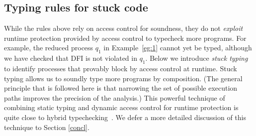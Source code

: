 \documentclass{sigplanconf}
\makeatletter
\def\upbracketfill{$\m@th\makesm@sh{\llap{\vrule\@height3\p@\@width.7\p@}}\leaders\vrule\@height.7\p@\hfill
\makesm@sh{\rlap{\vrule\@height3\p@\@width.7\p@}}$}
\def\downbracketfill{$\m@th \makesm@sh{\llap{\vrule\@height.7\p@\@depth2.3\p@\@width.7\p@}}\leaders\vrule\@height.7\p@\hfill \makesm@sh{\rlap{\vrule\@height.7\p@\@depth2.3\p@\@width.7\p@}}$}
\newcommand{\cenvvv}[3]{\vspace{0.8mm}
\begin{flushleft}
\parbox{8.4cm}{{\bf #1} $~#2$}
\\
\parbox{8.4cm}{\downbracketfill}
\\
\vspace{-0.2cm}
\end{flushleft}
#3
\begin{flushleft}
\parbox{8.4cm}{\upbracketfill}
\end{flushleft}}
\newcommand{\labp}{\mathsf P}
\newcommand{\labo}{\mathsf O}
\newcommand{\labb}{\mathsf S}
\newcommand{\labt}{\mathsf E}
\newcommand{\rem}[1]{$\textshade[.91]{sharpcorners}{\gdef\outlineboxwidth{0.01}$#1$}$}
\makeatother
\begin{document}
\subsection{Typing rules for stuck code}\label{stuck}


While the rules above rely on access control for soundness, they do not \emph{exploit} runtime protection provided by access control to typecheck more programs. For example, the reduced process $q_1$
in Example~\ref{eg:1} cannot yet be typed, although we have checked that DFI is not violated in $q_1$. Below we introduce \emph{stuck typing} to identify processes that provably block by access control at runtime. Stuck typing allows us to soundly type more programs by composition. 
(The general principle that is followed here is that narrowing the set of possible execution paths improves the precision of the analysis.) 
This powerful technique of combining static typing and dynamic access control for runtime protection is quite close to hybrid typechecking~\cite{hybtc}. We defer a more detailed discussion of this technique to Section \ref{concl}.
\end{document}
